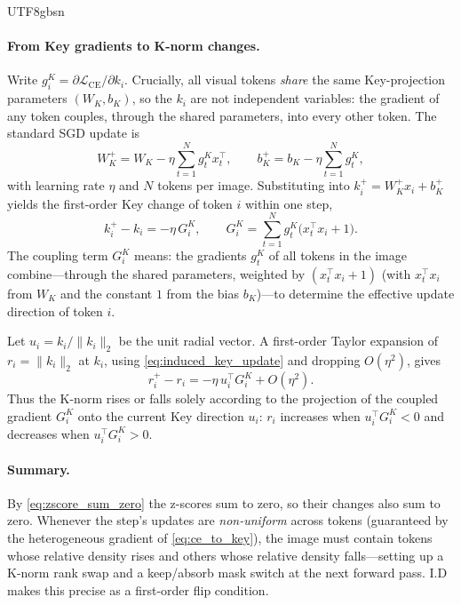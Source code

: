 \documentclass[10pt,twocolumn,letterpaper]{article}
\begin{document}
\begin{CJK}{UTF8}{gbsn}
\paragraph{From Key gradients to K-norm changes.}
Write $g_i^K=\partial\mathcal{L}_{\mathrm{CE}}/\partial k_i$. Crucially, all visual
tokens \emph{share} the same Key-projection parameters $(W_K,b_K)$, so the $k_i$
are not independent variables: the gradient of any token couples, through the
shared parameters, into every other token. The standard SGD update is
\begin{equation}
    W_K^+=W_K-\eta\sum_{t=1}^{N}g_t^K x_t^\top,\qquad
    b_K^+=b_K-\eta\sum_{t=1}^{N}g_t^K,
    \label{eq:sgd_wk}
\end{equation}
with learning rate $\eta$ and $N$ tokens per image. Substituting into
$k_i^+=W_K^+x_i+b_K^+$ yields the first-order Key change of token $i$ within one
step,
\begin{equation}
    k_i^+-k_i=-\eta\,G_i^K,\qquad
    G_i^K=\sum_{t=1}^{N}g_t^K\bigl(x_t^\top x_i+1\bigr).
    \label{eq:induced_key_update}
\end{equation}
The coupling term $G_i^K$ means: the gradients $g_t^K$ of all tokens in the image
combine—through the shared parameters, weighted by $(x_t^\top x_i+1)$ (with
$x_t^\top x_i$ from $W_K$ and the constant $1$ from the bias $b_K$)—to determine
the effective update direction of token $i$.

Let $u_i=k_i/\lVert k_i\rVert_2$ be the unit radial vector. A first-order Taylor
expansion of $r_i=\lVert k_i\rVert_2$ at $k_i$, using
\eqref{eq:induced_key_update} and dropping $O(\eta^2)$, gives
\begin{equation}
    r_i^+-r_i=-\eta\,u_i^\top G_i^K+O(\eta^2).
    \label{eq:norm_update}
\end{equation}
Thus the K-norm rises or falls solely according to the projection of the coupled
gradient $G_i^K$ onto the current Key direction $u_i$: $r_i$ increases when
$u_i^\top G_i^K<0$ and decreases when $u_i^\top G_i^K>0$.

\paragraph{Summary.}
By \eqref{eq:zscore_sum_zero} the z-scores sum to zero, so their changes also sum to zero. Whenever the step's updates are \emph{non-uniform} across tokens (guaranteed by the heterogeneous gradient of \eqref{eq:ce_to_key}), the image
must contain tokens whose relative density rises and others whose relative
density falls—setting up a K-norm rank swap and a keep/absorb mask switch at the
next forward pass. I.D makes this precise as a first-order flip condition.


\end{CJK}
\end{document}
